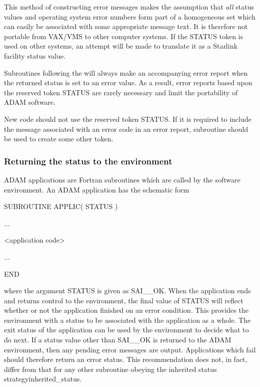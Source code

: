 \documentclass[twoside,11pt]{starlink}
\begin{document}
This method of constructing error messages makes the assumption that \emph{all}
status values and operating system error numbers form part of a homogeneous
set which can easily be associated with some appropriate message text.
It is therefore not portable from VAX/VMS to other computer systems.
If the STATUS token is used on other systems, an attempt will be made to
translate it as a Starlink facility status value.

Subroutines following the
 will
always make an accompanying error report when the returned status is set to an
error value.
As a result, error reports based upon the reserved token STATUS are rarely
necessary and limit the portability of ADAM software.

New code should not use the reserved token STATUS.
If it is required to include the message associated with an error code in an
error report, subroutine
 should be used to create some other token.

\subsubsection{Returning the status to the environment}
ADAM applications are Fortran subroutines which are called by the software
environment.
An ADAM application has the schematic form
\begin {small}
\begin{terminalv}
SUBROUTINE APPLIC( STATUS )

...

<application code>

...

END
\end{terminalv}
\end {small}

where the argument STATUS is given as SAI\_\_OK.
When the application ends and returns control to the environment, the final
value of STATUS will reflect whether or not the application finished on an
error condition.
This provides the environment with a status to be associated with the
application as a whole.
The exit status of the application can be used by the environment to decide
what to do next.
If a status value other than SAI\_\_OK is returned to the ADAM environment,
then any pending error messages are output.
Applications which fail should therefore return an error status.
This recommendation does not, in fact, differ from that for any other subroutine
obeying the
\htmlref
{inherited status strategy}{inherited_status}.
\end{document}
